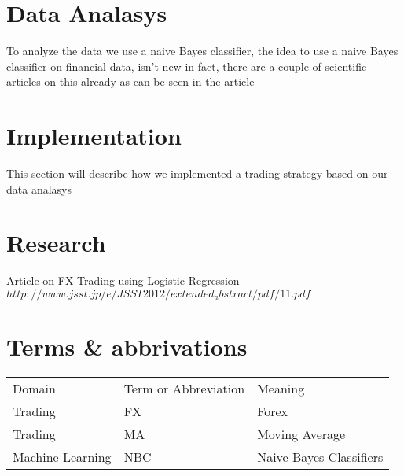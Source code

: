 \documentclass[10pt]{IEEEtran}
\begin{document}
\section{Data Analasys}
To analyze the data we use a naive Bayes classifier, the idea to use a naive Bayes classifier on financial data, isn't new in fact, there are a couple of scientific articles on this already as can be seen in the article 

\section{Implementation}
This section will describe how we implemented a trading strategy based on our data analasys \cite{fx_naive_bayes}


\section{Research}
Article on FX Trading using Logistic Regression
$http://www.jsst.jp/e/JSST2012/extended_abstract/pdf/11.pdf$

\section{Terms \& abbrivations}

\begin{tabular}{l | l | l}
Domain & Term or Abbreviation &  Meaning  \\
Trading & FX & Forex \\ 
Trading & MA & Moving Average\\
Machine Learning & NBC & Naive Bayes Classifiers\\
\end{tabular}
\end{document}
